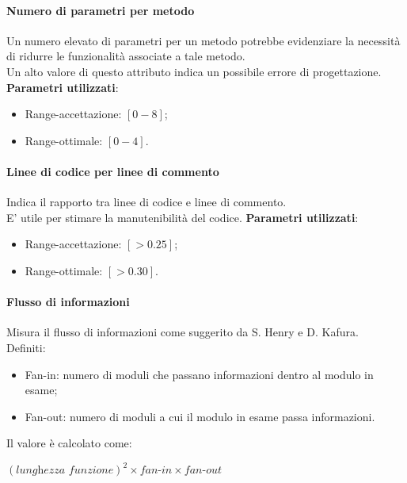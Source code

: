 \paragraph{Numero di parametri per metodo}
Un numero elevato di parametri per un metodo potrebbe evidenziare la necessità di ridurre le funzionalità associate a tale metodo.\\
Un alto valore di questo attributo indica un possibile errore di progettazione.
\textbf{Parametri utilizzati}:
\begin{itemize}
\item Range-accettazione: $[0-8]$;
\item Range-ottimale: $[0-4]$.
\end{itemize}

\paragraph{Linee di codice per linee di commento}
Indica il rapporto tra linee di codice e linee di commento.\\
E' utile per stimare la manutenibilità del codice.
\textbf{Parametri utilizzati}:
\begin{itemize}
\item Range-accettazione: $[>0.25]$;
\item Range-ottimale: $[>0.30]$.
\end{itemize}

\paragraph{Flusso di informazioni}
Misura il flusso di informazioni come suggerito da S. Henry e D. Kafura.\\
Definiti:
\begin{itemize}
\item Fan-in: numero di moduli che passano informazioni dentro al modulo in esame;
\item Fan-out: numero di moduli a cui il modulo in esame passa informazioni.
\end{itemize}
Il valore è calcolato come:
\begin{center}
$(\textit{lunghezza funzione})^2\times\textit{fan-in}\times\textit{fan-out}$
\end{center}

